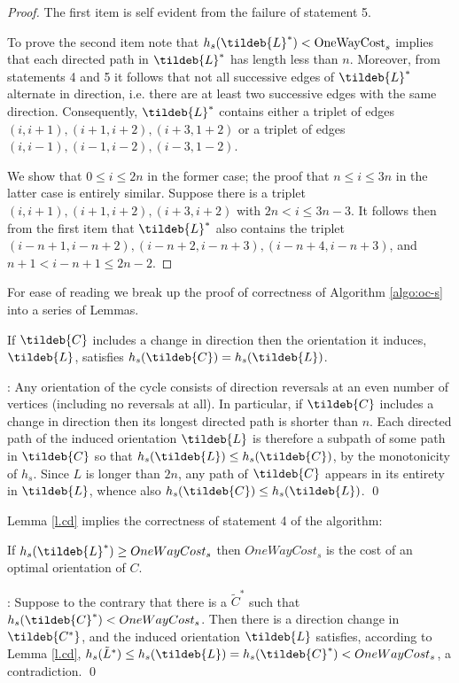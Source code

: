 \begin{proof}
	The first item is self evident from the failure of statement 5. 
	
	To prove the second item note 
	that $h_s(\tildeb{L}^*)<\mbox{OneWayCost}_s$ implies
	that each directed path in $\tildeb{L}^*$ has length less than $n$. Moreover, from
	statements 4 and 5 it follows that not all successive edges of $\tildeb{L}^*$ alternate in direction,
	i.e. there are at least two successive edges with the same direction. Consequently, 
	$\tildeb{L}^*$ contains either a triplet of edges $(i,i+1),(i+1,i+2),(i+3,1+2)$ or a triplet of edges 
	$(i,i-1),(i-1,i-2),(i-3,1-2)$. 
	
	We show that $0\leq i\leq 2n$ in the former case; the proof that $n\leq i\leq 3n$ in the latter case
	is entirely similar. Suppose there is a triplet $(i,i+1),(i+1,i+2),(i+3,i+2)$ with $2n< i \leq 3n-3$. 
	It follows then from the first item that $\tildeb{L}^*$ also contains the triplet $(i-n+1,i-n+2),(i-n+2,i-n+3),(i-n+4,i-n+3)$, and $n+1 < i-n+1 \leq 2n-2$.
	
	
\end{proof}

For ease of reading we break up the proof of correctness of Algorithm \ref{algo:oc-s} into a series of Lemmas. 

\begin{lemma}\label{l.cd}
	If $\tildeb{C}$ includes a change in direction then the orientation it induces,  $\tildeb{L}$, satisfies $h_s(\tildeb{C})= h_s(\tildeb{L})$.
\end{lemma}
:
Any orientation of the cycle consists of direction reversals at an even number of vertices 
(including no reversals at all). In particular, if $\tildeb{C}$  includes a change in direction 
then its longest directed path is
shorter than $n$. Each directed path of the induced orientation $\tildeb{L}$ is therefore a subpath 
of some path in $\tildeb{C}$ so that $h_s(\tildeb{L}) \leq h_s(\tildeb{C})$, 
by the monotonicity of $h_s$. 
Since $L$ is longer than $2n$, any path of $\tildeb{C}$ appears in its entirety in $\tildeb{L}$,
whence also $h_s(\tildeb{C})\leq h_s(\tildeb{L})$. 
\qed

Lemma \ref{l.cd} implies the correctness of statement 4 of the algorithm:
\begin{lemma}
	If $h_s(\tildeb{L}^*) \geq OneWayCost_s$ then $OneWayCost_s$ is the cost 
	of an optimal orientation of $C$. 
\end{lemma}
: Suppose to the contrary that there is a $\tilde{C}^*$ such that 
$h_s(\tildeb{C}^*)< OneWayCost_s$. Then there is a direction change in 
$\tildeb{C^*}$, and the induced orientation $\tildeb{L}$ satisfies, according to Lemma \ref{l.cd},
$h_s(\tilde{L}^*) \leq h_s(\tildeb{L}) =h_s(\tildeb{C}^*) < OneWayCost_s$,
a contradiction.
\qed

